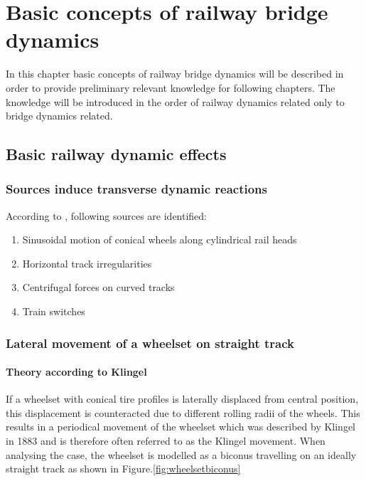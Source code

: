
\chapter{Basic concepts of railway bridge dynamics}

In this chapter basic concepts of railway bridge dynamics will be described in order to provide preliminary relevant knowledge for following chapters. The knowledge will be introduced in the order of railway dynamics related only to bridge dynamics related. 

\section{Basic railway dynamic effects}

\subsection{Sources induce transverse dynamic reactions}
According to \cite{da2007dynamic}\cite{fryba1996dynamics}\cite{EC12}, following sources are identified:

\begin{enumerate} [-]
    \item Sinusoidal motion of conical wheels along cylindrical rail heads
    \item Horizontal track irregularities
    \item Centrifugal forces on curved tracks
    \item Train switches
\end{enumerate}

\subsection{Lateral movement of a wheelset on straight track}

\subsubsection{Theory according to Klingel}

If a wheelset with conical tire profiles is laterally displaced from central position, this displacement is counteracted due to different rolling radii of the wheels. This results in a periodical movement of the wheelset which was described by Klingel in 1883 and is therefore often referred to as the Klingel movement. When analysing the case, the wheelset is modelled as a biconus travelling on an ideally straight track as shown in Figure.\ref{fig:wheelsetbiconus}

